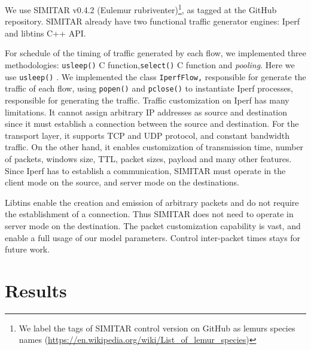 We use SIMITAR v0.4.2 (Eulemur rubriventer)\footnote{ We label the tags of SIMITAR control version on GitHub as lemurs species names (\href{https://en.wikipedia.org/wiki/List_of_lemur_species}{https://en.wikipedia.org/wiki/List\_of\_lemur\_species})}, as tagged at the GitHub repository.  SIMITAR already have two functional traffic generator engines: Iperf and libtins C++ API.  

For schedule of the timing of traffic generated by each flow, we implemented three methodologies: \texttt{usleep()} C function,\texttt{select()} C function and \textit{pooling}. Here we use \texttt{usleep()} . We implemented the class \texttt{IperfFlow,} responsible for generate the traffic of each flow, using \texttt{popen()} and \texttt{pclose()} to instantiate Iperf processes, responsible for generating the traffic. Traffic customization on Iperf has many limitations. It cannot assign arbitrary IP addresses as source and destination since it must establish a connection between the source and destination. For the transport layer, it supports TCP and UDP protocol, and constant bandwidth traffic. On the other hand, it enables customization of transmission time, number of packets, windows size, TTL, packet sizes, payload and many other features. Since Iperf has to establish a communication, SIMITAR must operate in the client mode on the source, and server mode on the destinations.

Libtins enable the creation and emission of arbitrary packets and do not require the establishment of a connection.  Thus SIMITAR does not need to operate in server mode on the destination. The packet customization capability is vast, and enable a full usage of our model parameters. Control inter-packet times stays for future work. 

\section{Results}


